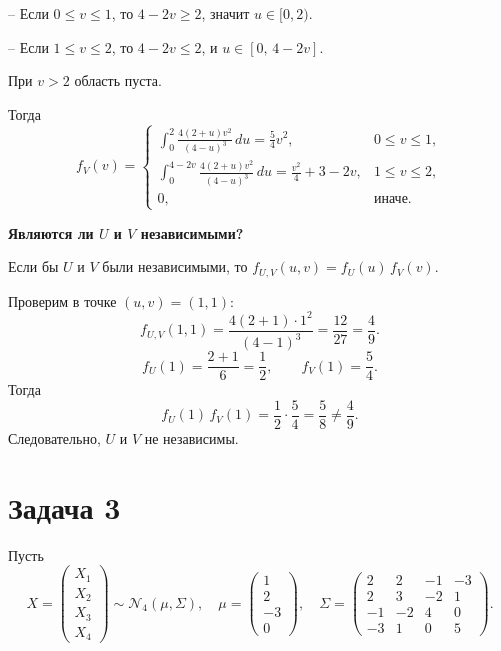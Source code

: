 \documentclass[12pt]{article}
\begin{document}
    -- Если $0 \le v \le 1$, то $4-2v \ge 2$, значит $u\in[0,2)$.

    -- Если $1 \le v \le 2$, то $4-2v \le 2$, и $u \in[0,\,4-2v]$.

    При $v>2$ область пуста.

    Тогда
    \[
        f_V(v)
        =
        \begin{cases}
            \displaystyle
            \int_0^{2} \frac{4(2+u)v^2}{(4-u)^3}\,du
            = \frac{5}{4}v^2, & 0 \le v \le 1,\\[12pt]
            \displaystyle
            \int_0^{4-2v} \frac{4(2+u)v^2}{(4-u)^3}\,du
            = \frac{v^2}{4} + 3 - 2v, & 1 \le v \le 2,\\[12pt]
            0, & \text{иначе.}
        \end{cases}
    \]

    \textbf{Являются ли $U$ и $V$ независимыми?}

    Если бы $U$ и $V$ были независимыми, то $f_{U,V}(u,v)=f_U(u)\,f_V(v)$.

    Проверим в точке $(u,v)=(1,1)$:
    \[
        f_{U,V}(1,1)
        = \frac{4(2+1)\cdot 1^2}{(4-1)^3}
        = \frac{12}{27}
        = \frac{4}{9}.
    \]
    \[
        f_U(1) = \frac{2+1}{6} = \frac12,
        \qquad
        f_V(1) = \frac{5}{4}.
    \]
    Тогда
    \[
        f_U(1)\,f_V(1)
        = \frac12 \cdot \frac{5}{4}
        = \frac{5}{8}
        \ne \frac{4}{9}.
    \]
    Следовательно, $U$ и $V$ не независимы.


    \section*{Задача 3}

    Пусть
    \[
        X =
        \begin{pmatrix}
            X_1\\ X_2\\ X_3\\ X_4
        \end{pmatrix}
        \sim
        \mathcal{N}_4(\mu,\Sigma),
        \quad
        \mu =
        \begin{pmatrix}
            1\\2\\-3\\0
        \end{pmatrix},
        \quad
        \Sigma =
        \begin{pmatrix}
            2 & 2 & -1 & -3\\
            2 & 3 & -2 & 1\\
            -1 & -2 & 4 & 0\\
            -3 & 1 & 0 & 5
        \end{pmatrix}.
    \]
\end{document}
